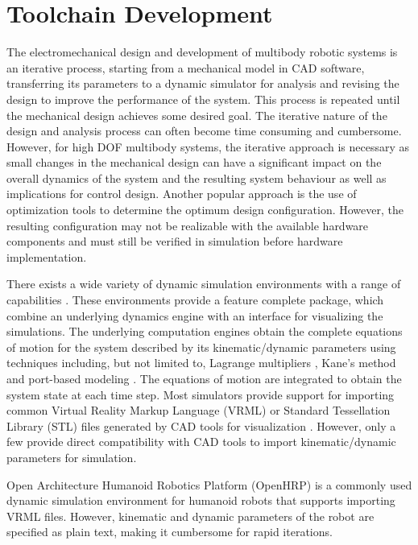 \chapter{Toolchain Development} %
\label{cha:toolchain}
The electromechanical design and development of multibody robotic systems is an iterative process, starting from a mechanical model in CAD software, transferring its parameters to a dynamic simulator for analysis and revising the design to improve the performance of the system. This process is repeated until the mechanical design achieves some desired goal. The iterative nature of the design and analysis process can often become time consuming and cumbersome. However, for high DOF multibody systems, the iterative approach is necessary as small changes in the mechanical design can have a significant impact on the overall dynamics of the system and the resulting system behaviour as well as implications for control design. Another popular approach is the use of optimization tools \cite{Paul2001,Wollherr2002} to determine the optimum design configuration. However, the resulting configuration may not be realizable with the available hardware components and must still be verified in simulation before hardware implementation. 

There exists a wide variety of dynamic simulation environments with a range of capabilities \cite{Koenig04designand,michel2004webotstm, Kanehiro:2004dq, PonticelliCWR2006, Reichenbach2009, MedranoCerda2010}. These environments provide a feature complete package, which combine an underlying dynamics engine with an interface for visualizing the simulations. The underlying computation engines obtain the complete equations of motion for the system described by its kinematic/dynamic parameters using techniques including, but not limited to, Lagrange multipliers \cite{Baraff1996}, Kane's method \cite{Rosenthal1986} and port-based modeling \cite{Paredis2001}. The equations of motion are integrated to obtain the system state at each time step. Most simulators provide support for importing common Virtual Reality Markup Language (VRML) or Standard Tessellation Library (STL) files generated by CAD tools for visualization \cite{Koenig04designand,michel2004webotstm}. However, only a few provide direct compatibility with CAD tools to import kinematic/dynamic parameters for simulation.

Open Architecture Humanoid Robotics Platform (OpenHRP) \cite{Kanehiro:2004dq} is a commonly used dynamic simulation environment for humanoid robots that supports importing VRML files. However, kinematic and dynamic parameters of the robot are specified as plain text, making it cumbersome for rapid iterations.

